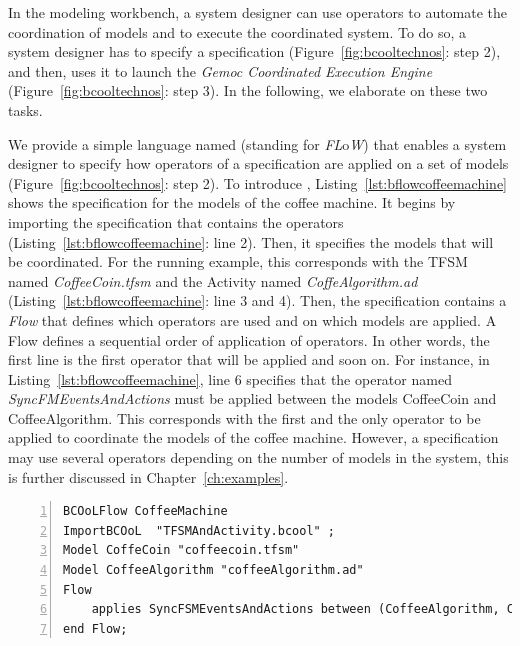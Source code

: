 In the modeling workbench, a system designer can use \bcool operators to automate the coordination of models and to execute the coordinated system. To do so, a system designer has to specify a \bflow specification (Figure~\ref{fig:bcooltechnos}: step 2), and then, uses it to launch the \emph{Gemoc Coordinated Execution Engine} (Figure~\ref{fig:bcooltechnos}: step 3). In the following, we elaborate on these two tasks.  

We provide a simple language named \bflow (standing for \bcool \emph{FL}o\emph{W}) that enables a system designer to specify how operators of a \bcool specification are applied on a set of models (Figure~\ref{fig:bcooltechnos}: step 2). To introduce \bflow, Listing~\ref{lst:bflowcoffeemachine} shows the specification for the models of the coffee machine. It begins by importing the \bcool specification that contains the operators (Listing~\ref{lst:bflowcoffeemachine}: line 2). Then, it specifies the models that will be coordinated. For the running example, this corresponds with the TFSM named \emph{CoffeeCoin.tfsm} and the Activity named \emph{CoffeAlgorithm.ad} (Listing~\ref{lst:bflowcoffeemachine}: line 3 and 4). Then, the specification contains a \emph{Flow} that defines which operators are used and on which models are applied. A Flow defines a sequential order of application of operators. In other words, the first line is the first operator that will be applied and soon on. For instance, in Listing~\ref{lst:bflowcoffeemachine}, line 6 specifies that the operator named \emph{SyncFMEventsAndActions} must be applied between the models CoffeeCoin and CoffeeAlgorithm. This corresponds with the first and the only operator to be applied to coordinate the models of the coffee machine. However, a \bflow specification may use several operators depending on the number of models in the system, this is further discussed in Chapter~\ref{ch:examples}.  

\begin{lstlisting}[language=bflow,
caption={\bflow specification for the models of the coffee machine},
label={lst:bflowcoffeemachine}, 
basicstyle=\scriptsize\ttfamily, backgroundcolor=\color{LGrey}, numbers=left, xleftmargin=2pt]
BCOoLFlow CoffeeMachine
ImportBCOoL  "TFSMAndActivity.bcool" ;
Model CoffeCoin "coffeecoin.tfsm"
Model CoffeeAlgorithm "coffeeAlgorithm.ad"
Flow 
	applies SyncFSMEventsAndActions between (CoffeeAlgorithm, CoffeCoin);
end Flow;
\end{lstlisting}


